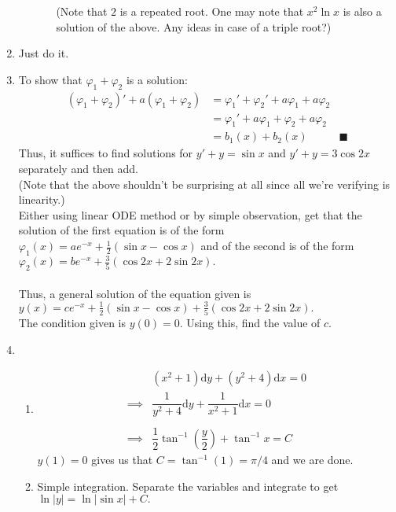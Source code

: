 \documentclass[12pt]{article}
\theoremstyle{definition}
\numberwithin{thm}{section}
\newcommand{\dd}{{\mathrm d}}
\begin{document}
\begin{enumerate}[leftmargin=*, label = Q.\arabic*.]
\begin{enumerate}[label = (\alph*)]
\begin{enumerate}[label = (\roman*)]
			(Note that $2$ is a repeated root. One may note that $x^2\ln x$ is also a solution of the above. Any ideas in case of a triple root?)
		\end{enumerate}	
	\end{enumerate}
	\item Just do it. \checkmark
	\item To show that $\varphi_1 + \varphi_2$ is a solution:\\
	\begin{align*} 
		(\varphi_1 + \varphi_2)' + a(\varphi_1 + \varphi_2) &= \varphi_1' + \varphi_2' + a\varphi_1 + a\varphi_2\\
		&= \varphi_1' + a\varphi_1 + \varphi_2 + a\varphi_2\\
		&= b_1(x) + b_2(x) & \blacksquare
	\end{align*}
	Thus, it suffices to find solutions for $y' + y = \sin x$ and $y' + y = 3\cos 2x$ separately and then add.\\
	(Note that the above shouldn't be surprising at all since all we're verifying is linearity.)\\
	Either using linear ODE method or by simple observation, get that the solution of the first equation is of the form $\varphi_1(x) = ae^{-x} + \frac{1}{2}(\sin x - \cos x)$ and of the second is of the form $\varphi_2(x) = be^{-x} + \frac{3}{5}(\cos2x + 2\sin 2x).$\\~\\
	Thus, a general solution of the equation given is $y(x) = ce^{-x} + \frac{1}{2}(\sin x - \cos x) + \frac{3}{5}(\cos2x + 2\sin 2x).$\\
	The condition given is $y(0) = 0.$ Using this, find the value of $c.$
	\item 
	\begin{enumerate}[label = (\roman*)] 
		\item 
		\begin{align*} 
			& (x^2 + 1)\dd y + (y^2 + 4)\dd x = 0\\
			\implies & \dfrac{1}{y^2 + 4}\dd y + \dfrac{1}{x^2 + 1}\dd x = 0\\~\\
			\implies & \dfrac{1}{2}\tan^{-1}\left(\dfrac{y}{2}\right) + \tan^{-1}x = C
		\end{align*}
		$y(1) = 0$ gives us that $C = \tan^{-1}(1) = \pi/4$ and we are done.
		\item Simple integration. Separate the variables and integrate to get $\ln|y| = \ln|\sin x| + C.$\\

\end{enumerate}
\end{enumerate}
\end{document}
